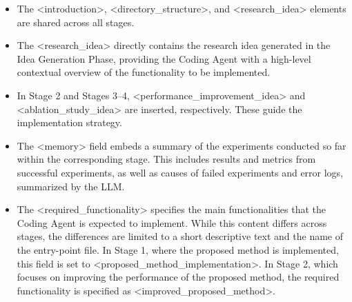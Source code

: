 \begin{itemize}
\item The <introduction>, <directory\_structure>, and <research\_idea> elements are shared across all stages.
\item The <research\_idea> directly contains the research idea generated in the Idea Generation Phase, providing the Coding Agent with a high-level contextual overview of the functionality to be implemented.
\item In Stage 2 and Stages 3–4, <performance\_improvement\_idea> and <ablation\_study\_idea> are inserted, respectively. These guide the implementation strategy.
\item The <memory> field embeds a summary of the experiments conducted so far within the corresponding stage. This includes results and metrics from successful experiments, as well as causes of failed experiments and error logs, summarized by the LLM.
\item The <required\_functionality> specifies the main functionalities that the Coding Agent is expected to implement. While this content differs across stages, the differences are limited to a short descriptive text and the name of the entry-point file. In Stage 1, where the proposed method is implemented, this field is set to <proposed\_method\_implementation>. In Stage 2, which focuses on improving the performance of the proposed method, the required functionality is specified as <improved\_proposed\_method>.
\end{itemize}

